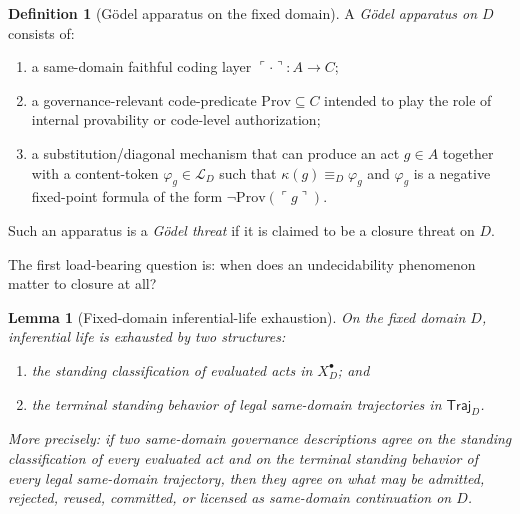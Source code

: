 \documentclass[11pt]{article}
\theoremstyle{plain}
\newtheorem{lemma}[theorem]{Lemma}
\theoremstyle{definition}
\newtheorem{definition}[theorem]{Definition}
\newcommand{\Prov}{\mathrm{Prov}}
\newcommand{\code}[1]{\ulcorner #1 \urcorner}
\newcommand{\Eval}{X_D^{\bullet}}
\newcommand{\domain}{D}
\newcommand{\Traj}{\mathsf{Traj}_D}
\begin{document}
\begin{definition}[G\"odel apparatus on the fixed domain]
A \emph{G\"odel apparatus on $\domain$} consists of:
\begin{enumerate}[label=(\alph*), leftmargin=2.5em]
    \item a same-domain faithful coding layer $\code{\cdot}:A\to C$;
    \item a governance-relevant code-predicate $\Prov\subseteq C$ intended to play the role of internal provability or code-level authorization;
    \item a substitution/diagonal mechanism that can produce an act $g\in A$ together with a content-token $\varphi_g\in \mathcal{L}_{\domain}$ such that $\kappa(g)\equiv_{\domain}\varphi_g$ and $\varphi_g$ is a negative fixed-point formula of the form $\neg \Prov(\code{g})$.
\end{enumerate}
Such an apparatus is a \emph{G\"odel threat} if it is claimed to be a closure threat on $\domain$.
\end{definition}

The first load-bearing question is: when does an undecidability phenomenon matter to closure at all?

\begin{lemma}[Fixed-domain inferential-life exhaustion]
\label{lem:inferential-life-exhaustion}
On the fixed domain $\domain$, inferential life is exhausted by two structures:
\begin{enumerate}[label=(\roman*), leftmargin=2.5em]
    \item the standing classification of evaluated acts in $\Eval$; and
    \item the terminal standing behavior of legal same-domain trajectories in $\Traj$.
\end{enumerate}
More precisely: if two same-domain governance descriptions agree on the standing classification of every evaluated act and on the terminal standing behavior of every legal same-domain trajectory, then they agree on what may be admitted, rejected, reused, committed, or licensed as same-domain continuation on $\domain$.
\end{lemma}
\end{document}
